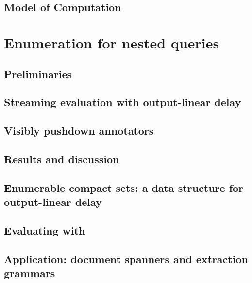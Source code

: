 \documentclass[pdftex]{pucthesis}	%
\begin{document}
\section{Model of Computation}




\chapter[ENUMERATION FOR NESTED QUERIES]{Enumeration for nested queries} \label{ch1}

\label{nested:sec:intro}


\section{Preliminaries}\label{nested:sec:prelim}


\section{Streaming evaluation with output-linear delay}\label{nested:sec:enum}


\section{Visibly pushdown annotators}\label{nested:sec:vpann}


\section{Results and discussion}\label{nested:sec:results}


\section{Enumerable compact sets: a data structure for output-linear delay}\label{nested:sec:ds}


\section{Evaluating \vpannnames with \lindelay}\label{nested:sec:eval}


\section{Application: document spanners and extraction grammars}\label{nested:sec:spanners}

\end{document}
